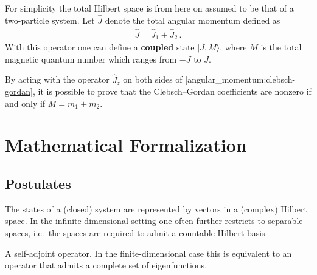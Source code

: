     For simplicity the total Hilbert space is from here on assumed to be that of a two-particle system. Let $\hat{J}$ denote the total angular momentum defined as
    \begin{gather}
        \hat{J} = \hat{J}_1 + \hat{J}_2\,.
    \end{gather}
    With this operator one can define a \textbf{coupled} state $|J,M\rangle$, where $M$ is the total magnetic quantum number which ranges from $-J$ to $J$.


    \begin{property}
        By acting with the operator $\hat{J}_z$ on both sides of \cref{angular_momentum:clebsch-gordan}, it is possible to prove that the Clebsch--Gordan coefficients are nonzero if and only if $M = m_1 + m_2$.
    \end{property}

\section{Mathematical Formalization}\label{section:mathematical_formalism_qm}
\subsection{Postulates}

    \begin{axiom}
        The states of a (closed) system are represented by vectors in a (complex) Hilbert space. In the infinite-dimensional setting one often further restricts to separable spaces, i.e.~the spaces are required to admit a countable Hilbert basis.
    \end{axiom}

    \begin{axiom}[Observables]
        A self-adjoint operator. In the finite-dimensional case this is equivalent to an operator that admits a complete set of eigenfunctions.
    \end{axiom}

